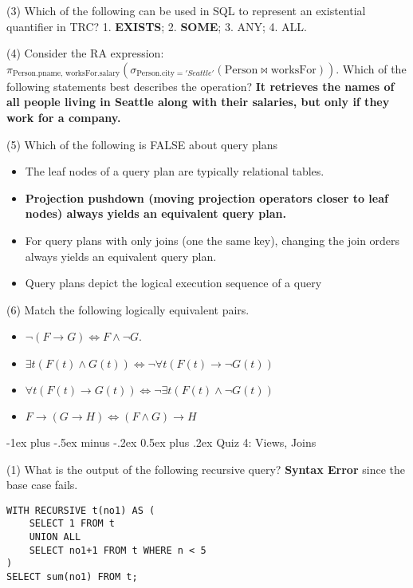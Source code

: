\documentclass[10pt,landscape]{article}
\makeatletter
\newcommand{\ans}[1]{{\color{purple} \textbf{#1}}}
\renewcommand{\section}{\@startsection{section}{1}{0mm}%
                                {-1ex plus -.5ex minus -.2ex}%
                                {0.5ex plus .2ex}%
                                {\normalfont\large\bfseries}}
\makeatother
\begin{document}
\begin{multicols}{4}
(3) Which of the following can be used in SQL to represent an existential quantifier in TRC? 1. \ans{EXISTS}; 2. \ans{SOME}; 3. ANY; 4. ALL.

(4) Consider the RA expression: $\pi_{\text{Person.pname, worksFor.salary}} (\sigma_{\text{Person.city} = 'Seattle'} (\text{Person} \bowtie \text{worksFor}))$. Which of the following statements best describes the operation? \ans{It retrieves the names of all people living in Seattle along with their salaries, but only if they work for a company.}

(5) Which of the following is FALSE about query plans

\begin{itemize}
	\item The leaf nodes of a query plan are typically relational tables.
	\item \ans{Projection pushdown (moving projection operators closer to leaf nodes) always yields an equivalent query plan. }
	\item For query plans with only joins (one the same key), changing the join orders always yields an equivalent query plan. 
	\item Query plans depict the logical execution sequence of a query 
\end{itemize}

(6) Match the following logically equivalent pairs.

\begin{itemize}
	\item $\neg (F \rightarrow G) \iff F \land \neg G$.
	\item $\exists t (F(t) \land G(t)) \iff \neg \forall t (F(t) \rightarrow \neg G(t))$
	\item $\forall t (F(t) \rightarrow G(t)) \iff \neg \exists t (F(t) \land \neg G(t))$
	\item $F \rightarrow (G \rightarrow H) \iff (F\land G) \rightarrow H$
\end{itemize}

\section{Quiz 4: Views, Joins}

(1) What is the output of the following recursive query? \ans{Syntax Error} since the base case fails.

\begin{lstlisting}
WITH RECURSIVE t(no1) AS (
    SELECT 1 FROM t
    UNION ALL
    SELECT no1+1 FROM t WHERE n < 5
)
SELECT sum(no1) FROM t;
\end{lstlisting}


\end{multicols}
\end{document}
